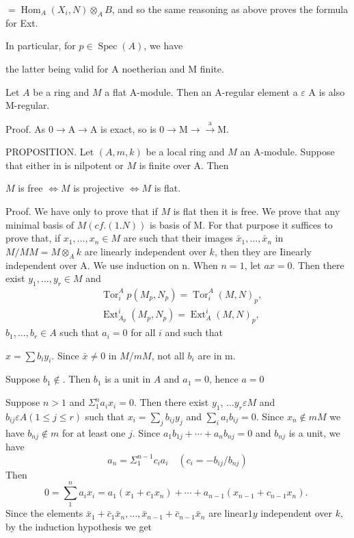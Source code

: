 $=\operatorname{Hom}_{A}\left(X_{i}, N\right) \otimes_{A} B$, and so the same reasoning as above proves the formula for Ext.

In particular, for $p \in \operatorname{Spec}(A)$, we have

the latter being valid for A noetherian and M finite.

Let $A$ be a ring and $M$ a flat A-module. Then an A-regular element a $\varepsilon$ A is also M-regular.

Proof. As $0 \rightarrow \mathrm{A} \rightarrow \mathrm{A}$ is exact, so is $0 \rightarrow \mathrm{M} \rightarrow \stackrel{\mathrm{a}}{\rightarrow} \mathrm{M} .$

PROPOSITION. Let $(A, m, k)$ be a local ring and $M$ an A-module. Suppose that either in is nilpotent or $M$ is finite over A. Then

$M$ is free $\Leftrightarrow M$ is projective $\Leftrightarrow M$ is flat.

Proof. We have only to prove that if $M$ is flat then it is free. We prove that any minimal basis of $M(c f .(1 . N))$ is basis of M. For that purpose it suffices to prove that, if $x_{1}, \ldots, x_{n} \in M$ are such that their images $\bar{x}_{1}, \ldots, \bar{x}_{n}$ in $M / M M=M \otimes_{A} k$ are linearly independent over $k$, then they are Iinearly independent over A. We use induction on $\mathrm{n}$. When $n=1$, let $a x=0 .$ Then there exist $y_{1}, \ldots, y_{r} \in M$ and
$$
\begin{aligned}
& \operatorname{Tor}_{i}^{A} p\left(M_{p}, N_{p}\right)=\operatorname{Tor}_{i}^{A}(M, N)_{p}, \\
& \operatorname{Ext}_{A_{p}}^{i}\left(M_{p}, N_{p}\right)=\operatorname{Ext}_{A}^{i}(M, N)_{p}, 
\end{aligned}
$$
$b_{1}, \ldots, b_{r} \in A$ such that $a_{i}=0$ for all $i$ and such that

$x=\sum b_{i} y_{i} .$ Since $\bar{x} \neq 0$ in $M / m M$, not all $b_{i}$ are in m.

Suppose $b_{1} \notin$. Then $b_{1}$ is a unit in $A$ and $a_{1}=0$, hence $a=0$

Suppose $n>1$ and $\Sigma_{1}^{n} a_{i} x_{i}=0$. Then there exist $y_{1}$, $\ldots y_{r} \varepsilon M$ and $b_{i j} \varepsilon A(1 \leqslant j \leqslant r)$ such that $x_{i}=\sum_{j} b_{i j} y_{j}$ and $\sum_{i} a_{i} b_{i j}=0$. Since $x_{n} \notin m M$ we have $b_{n j} \notin m$ for at least one $j$. Since $a_{1} b_{1 j}+\cdots+a_{n} b_{n j}=0$ and $b_{n j}$ is a unit, we have
$$
a_{n}=\Sigma_{1}^{n-1} c_{i} a_{i} \quad\left(c_{i}=-b_{i j} / b_{n j}\right)
$$
Then
$$
0=\sum_{1}^{n} a_{i} x_{i}=a_{1}\left(x_{1}+c_{1} x_{n}\right)+\cdots+a_{n-1}\left(x_{n-1}+c_{n-1} x_{n}\right) \text {. }
$$
Since the elements $\bar{x}_{1}+\bar{c}_{1} \bar{x}_{n}, \ldots, \bar{x}_{n-1}+\bar{c}_{n-1} \bar{x}_{n}$ are linear$1 y$ independent over $k$, by the induction hypothesis we get

